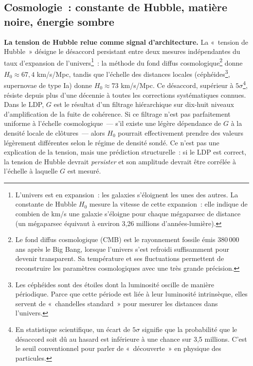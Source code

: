 \documentclass[12pt, a4paper, openright]{book}
\begin{document}
\subsection*{Cosmologie~: constante de Hubble, matière noire, énergie sombre}

\textbf{La tension de Hubble relue comme signal d'architecture.} La «~tension de Hubble~» désigne le désaccord persistant entre deux mesures indépendantes du taux d'expansion de l'univers\footnote{L'univers est en expansion~: les galaxies s'éloignent les unes des autres. La constante de Hubble $H_0$ mesure la vitesse de cette expansion~: elle indique de combien de km/s une galaxie s'éloigne pour chaque mégaparsec de distance (un mégaparsec équivaut à environ 3,26 millions d'années-lumière).}~: la méthode du fond diffus cosmologique\footnote{Le fond diffus cosmologique (CMB) est le rayonnement fossile émis 380\,000 ans après le Big Bang, lorsque l'univers s'est refroidi suffisamment pour devenir transparent. Sa température et ses fluctuations permettent de reconstruire les paramètres cosmologiques avec une très grande précision.} donne $H_0 \approx 67{,}4$ km/s/Mpc, tandis que l'échelle des distances locales (céphéides\footnote{Les céphéides sont des étoiles dont la luminosité oscille de manière périodique. Parce que cette période est liée à leur luminosité intrinsèque, elles servent de «~chandelles standard~» pour mesurer les distances dans l'univers.}, supernovae de type Ia) donne $H_0 \approx 73$ km/s/Mpc. Ce désaccord, supérieur à $5\sigma$\footnote{En statistique scientifique, un écart de $5\sigma$ signifie que la probabilité que le désaccord soit dû au hasard est inférieure à une chance sur 3,5 millions. C'est le seuil conventionnel pour parler de «~découverte~» en physique des particules.}, résiste depuis plus d'une décennie à toutes les corrections systématiques connues. Dans le LDP, $G$ est le résultat d'un filtrage hiérarchique sur dix-huit niveaux d'amplification de la fuite de cohérence. Si ce filtrage n'est pas parfaitement uniforme à l'échelle cosmologique~--- s'il existe une légère dépendance de $G$ à la densité locale de clôtures~--- alors $H_0$ pourrait effectivement prendre des valeurs légèrement différentes selon le régime de densité sondé. Ce n'est pas une explication de la tension, mais une prédiction structurelle~: si le LDP est correct, la tension de Hubble devrait \emph{persister} et son amplitude devrait être corrélée à l'échelle à laquelle $G$ est mesuré.

\medskip
\end{document}

